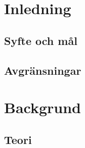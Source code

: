 \documentclass[11pt,a4paper,oneside]{book}
\begin{document}


\tableofcontents
\mainmatter

\chapter{Inledning}


\section{Syfte och mål} %


\section{Avgränsningar} %



\chapter{Backgrund}

\section{Teori}

\end{document}
